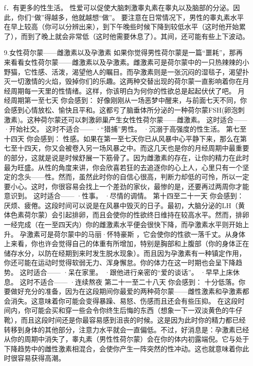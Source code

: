 \documentclass[12pt,UTF8]{ctexbook}
\begin{document}
f．有更多的性生活。
性爱可以促使大脑刺激睾丸素在睾丸以及脑部的分泌。因此，你们“做”得越多，他就越想“做”。
要注意在日常情况下，男性的睾丸素水平在早上较高（你可以分辨出来），到下午晚些时候下降到较低水平（这时他开始累了），而到了晚上就会非常低（这时他需要休息了）。其间，还可能有些上下波动。

9.女性荷尔蒙——雌激素以及孕激素
如果你觉得男性荷尔蒙是一篇“噩耗”，那再来看看女性荷尔蒙——雌激素以及孕激素。雌激素可是荷尔蒙中的一只热辣辣的小野猫，它性感、活泼，渴望他人的瞩目。而孕激素则是一张沉闷的湿毯子，渴望扑灭一切激情的火焰，毁掉你们的乐趣。这两种交替出现的荷尔蒙一直影响着你在月经周期每一天里的性情绪。这样，你该明白为何你的性欲总是起起伏伏了吧。
月经周期第一至七天
你会感到：
好像刚刚从一场恶梦中醒来，与前面七天不同，你会感到心情放松、愉快且平和。这都亏了脑垂体所分泌的一种荷尔蒙FSH(卵泡刺激素)。这种荷尔蒙还可以刺激卵巢产生女性性荷尔蒙——雌激素。
这时适合——
·开始社交。
这时不适合——
·“猎捕”男性。
·沉溺于高强度的性生活。
第七至十四天
你会感到：
性感。如果在第一至七天你已从风暴中心平静下来，那么在第七至十四天，你又会被卷入另一场风暴之中。而这几天也是你的月经周期中最重要的部分，这就是说是时候舒展一下筋骨了。因为雌激素的存在，让你的精力在此时最为旺盛。从性的角度来讲，你会欣喜若狂的去追逐你的心上人，心里只有一个坚定的念头——性。然而，虽然此时你的自信心很高，判断力却低的可怜，所以一定要小心。这时，你很容易会找上一个差劲的家伙，最惨的是，还要再过两周你才能意识到。
这时适合——
·性事。
·尽情的调情。
第十四至二十一天
你会感到：
厌烦、疲倦。这段时间可以说是在风暴中毁灭的日子。最初，大脑分泌的LH（黄体色素荷尔蒙）会引起排卵，而且会使你的性欲终日维持在较高水平。然而，排卵一经完成（在一至四天内）你的雌激素水平便会很快下降，而孕激素水平则开始上升。
孕激素可是荷尔蒙中的马丽·怀特豪斯 ，它会使你的性欲一落千丈。从身体上来看，你也许会觉得自己的体重有所增加，特别是胸部和上腹部（你的身体正在储存水分，以防在经期到来时发生脱水现象）。而且因为孕激素有一种镇定作用，你还可能在运动时觉得软弱无力、浑身懈怠。你的体力在这一时期也会呈下降趋势。
这时适合——
·呆在家里。
·跟他进行亲密的“爱的谈话”。
·早早上床休息。
这时不适合——
·连续熬夜
第二十一至二十八天
你会感到：
十分低落。你要做好充分的准备，因为在这段期间你最爱的两种荷尔蒙——雌性激素和孕激素都会消失。这意味着你可能会变得暴躁、易怒、伤感而且还会有些压抑。
在这段时间内，你可能会买和穿一些会令你终生后悔的东西（想象一下一双淡黄色的牛仔靴），而且这段时间还是你最容易感到沮丧的时候。这是因为此时你的精力都已经转移到身体的其他部分，注意力水平就会一直偏低。不过，好消息是：孕激素已经从你的周期中消失了，睾丸素（男性性荷尔蒙）会在你的体内初露端倪。它与处于下降趋势中的雌性激素相混合，会使你产生一阵突然的性冲动。这也就意味着你此时很容易获得高潮。
\end{document}
